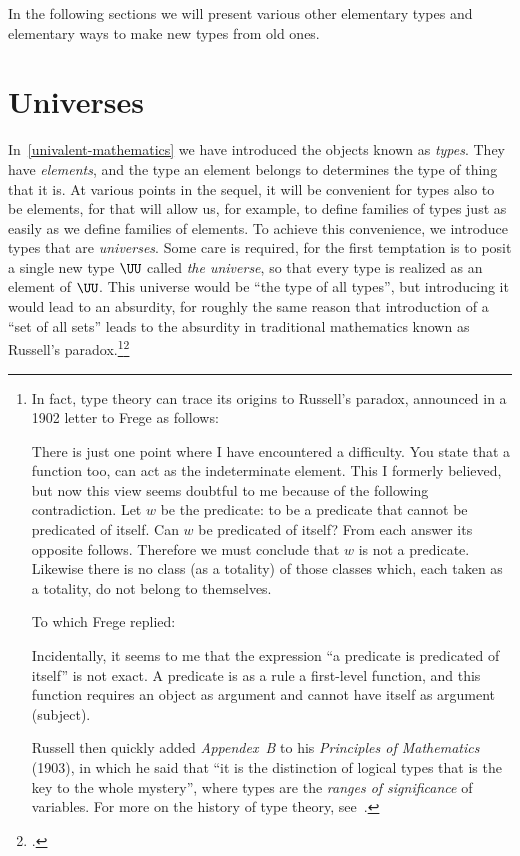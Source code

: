 In the following sections we will present various other elementary types and elementary ways to make new types from old ones.

\section{Universes}
\label{sec:universes}

In~\cref{univalent-mathematics} we have introduced the objects known as \emph{types}.  They have \emph{elements}, and the type an
element belongs to determines the type of thing that it is.  At various points in the sequel, it will be convenient for types also to be
elements, for that will allow us, for example, to define families of types just as easily as we define families of elements.  To achieve this
convenience, we introduce types that are \emph{universes}.  Some care is required, for the first temptation is to posit a
single new type $\UU$ called \emph{the universe}, so that every type is realized as an element of $\UU$.  This universe would be ``the type of
all types'', but introducing it would lead to an absurdity, for roughly the same reason that introduction of a ``set of all sets'' leads to the absurdity
in traditional mathematics known as Russell's paradox.\footnote{%
  In fact, type theory can trace its origins to Russell's paradox,
  announced in a 1902 letter to Frege as follows:\\
  \begin{adjustwidth}{\parindent}{}
    There is just one point where I have encountered a difficulty.
    You state that a function too, can act as the indeterminate element.
    This I formerly believed,
    but now this view seems doubtful to me because of the following contradiction.
    Let $w$ be the predicate: to be a predicate that cannot be predicated of itself.
    Can $w$ be predicated of itself? From each answer its opposite follows.
    Therefore we must conclude that $w$ is not a predicate.
    Likewise there is no class (as a totality) of those classes which,
    each taken as a totality, do not belong to themselves.
  \end{adjustwidth}
  To which Frege replied:
  \begin{adjustwidth}{\parindent}{}
  Incidentally, it seems to me that the expression
  ``a predicate is predicated of itself'' is not exact.
  A predicate is as a rule a first-level function,
  and this function requires an object as argument
  and cannot have itself as argument (subject).
  \end{adjustwidth}
  Russell then quickly added \emph{Appendex~B} to his
  \emph{Principles of Mathematics} (1903), in which he said that
  ``it is the distinction of logical types that is the key to the whole mystery'',
  where types are the \emph{ranges of significance} of variables.
  For more on the history of type theory,
  see~\citeauthor{sep-type-theory}\footnotemark{}.}\footcitetext{sep-type-theory}
